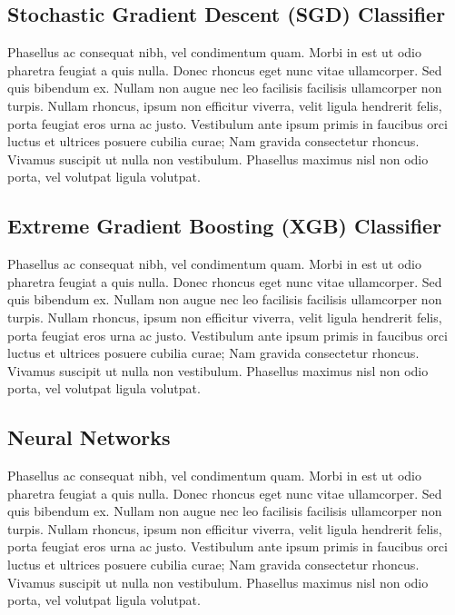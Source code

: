 \documentclass[
]{article}
\begin{document}
\hypertarget{stochastic-gradient-descent-sgd-classifier}{%
\subsection{Stochastic Gradient Descent (SGD)
Classifier}\label{stochastic-gradient-descent-sgd-classifier}}

Phasellus ac consequat nibh, vel condimentum quam. Morbi in est ut odio
pharetra feugiat a quis nulla. Donec rhoncus eget nunc vitae
ullamcorper. Sed quis bibendum ex. Nullam non augue nec leo facilisis
facilisis ullamcorper non turpis. Nullam rhoncus, ipsum non efficitur
viverra, velit ligula hendrerit felis, porta feugiat eros urna ac justo.
Vestibulum ante ipsum primis in faucibus orci luctus et ultrices posuere
cubilia curae; Nam gravida consectetur rhoncus. Vivamus suscipit ut
nulla non vestibulum. Phasellus maximus nisl non odio porta, vel
volutpat ligula volutpat.

\hypertarget{extreme-gradient-boosting-xgb-classifier}{%
\subsection{Extreme Gradient Boosting (XGB)
Classifier}\label{extreme-gradient-boosting-xgb-classifier}}

Phasellus ac consequat nibh, vel condimentum quam. Morbi in est ut odio
pharetra feugiat a quis nulla. Donec rhoncus eget nunc vitae
ullamcorper. Sed quis bibendum ex. Nullam non augue nec leo facilisis
facilisis ullamcorper non turpis. Nullam rhoncus, ipsum non efficitur
viverra, velit ligula hendrerit felis, porta feugiat eros urna ac justo.
Vestibulum ante ipsum primis in faucibus orci luctus et ultrices posuere
cubilia curae; Nam gravida consectetur rhoncus. Vivamus suscipit ut
nulla non vestibulum. Phasellus maximus nisl non odio porta, vel
volutpat ligula volutpat.

\hypertarget{neural-networks}{%
\subsection{Neural Networks}\label{neural-networks}}

Phasellus ac consequat nibh, vel condimentum quam. Morbi in est ut odio
pharetra feugiat a quis nulla. Donec rhoncus eget nunc vitae
ullamcorper. Sed quis bibendum ex. Nullam non augue nec leo facilisis
facilisis ullamcorper non turpis. Nullam rhoncus, ipsum non efficitur
viverra, velit ligula hendrerit felis, porta feugiat eros urna ac justo.
Vestibulum ante ipsum primis in faucibus orci luctus et ultrices posuere
cubilia curae; Nam gravida consectetur rhoncus. Vivamus suscipit ut
nulla non vestibulum. Phasellus maximus nisl non odio porta, vel
volutpat ligula volutpat.
\end{document}

